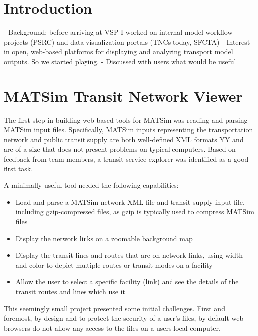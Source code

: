 \hypertarget{server-experiments-introduction}{%
\section{Introduction}\label{server-experiments-intro}}

- Background: before arriving at VSP I worked on internal model workflow projects (PSRC) and data visualization portals (TNCs today, SFCTA)
- Interest in open, web-based platforms for displaying and analyzing transport model outputs. So we started playing.
- Discussed with users what would be useful

\hypertarget{server-experiments-transit}{%
\section{MATSim Transit Network Viewer}\label{server-experiments-transit}}

The first step in building web-based tools for MATSim was reading and parsing MATSim input files. Specifically, MATSim inputs representing the transportation network and public transit supply are both well-defined XML formats YY and are of a size that does not present problems on typical computers. Based on feedback from team members, a transit service explorer was identified as a good first task.

A minimally-useful tool needed the following capabilities:

\begin{itemize}
  \tightlist
  \item
    Load and parse a MATSim network XML file and transit supply input file, including gzip-compressed files, as gzip is typically used to compress MATSim files
  \item
    Display the network links on a zoomable background map
  \item
    Display the transit lines and routes that are on network links, using width and color to depict multiple routes or transit modes on a facility
  \item
    Allow the user to select a specific facility (link) and see the details of the transit routes and lines which use it
\end{itemize}

This seemingly small project presented some initial challenges. First and foremost, by design and to protect the security of a user's files, by default web browsers do not allow any access to the files on a users local computer.

